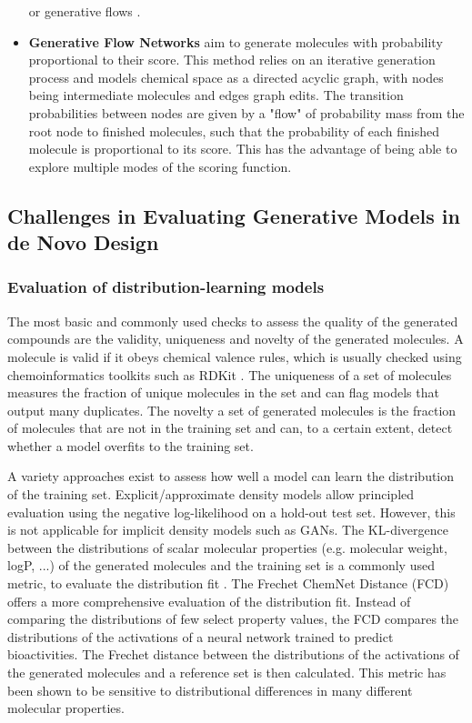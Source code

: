 \begin{itemize}
            or generative flows \citep{madhawaGraphNVPInvertibleFlow2019}.
      \item \textbf{Generative Flow Networks} \citep{bengioFlowNetworkBased2021} aim to generate
            molecules with probability proportional to their score. This method relies on an
            iterative generation process and models chemical space as a directed acyclic graph, with
            nodes being intermediate molecules and edges graph edits. The transition probabilities
            between nodes are given by a "flow" of probability mass from the root node to finished
            molecules, such that the probability of each finished molecule is proportional to its
            score. This has the advantage of being able to explore multiple modes of the scoring
            function.
\end{itemize}

\subsection{Challenges in Evaluating Generative Models in de Novo Design}
\subsubsection{Evaluation of distribution-learning models}
The most basic and commonly used checks to assess the quality of the generated compounds are the
validity, uniqueness and novelty of the generated molecules. A molecule is valid if it obeys
chemical valence rules, which is usually checked using chemoinformatics toolkits such as RDKit
\citep{landrumRDKitOpensourceCheminformatics2006}. The uniqueness of a set of molecules measures the
fraction of unique molecules in the set and can flag models that output many duplicates. The novelty
a set of generated molecules is the fraction of molecules that are not in the training set and can,
to a certain extent, detect whether a model overfits to the training set.

A variety approaches exist to assess how well a model can learn the distribution of the training
set. Explicit/approximate density models allow principled evaluation using the negative
log-likelihood on a hold-out test set. However, this is not applicable for implicit density models
such as GANs. The KL-divergence between the distributions of scalar molecular properties (e.g.
molecular weight, logP, ...) of the generated molecules and the training set is a commonly used
metric, to evaluate the distribution fit \citep{brownGuacaMolBenchmarkingModels2019}. The Frechet
ChemNet Distance (FCD) \citep{preuerFrechetChemNetDistance2018} offers a more comprehensive evaluation
of the distribution fit. Instead of comparing the distributions of few select property values,
the FCD compares the distributions of the activations of a neural network trained to predict
bioactivities. The Frechet distance between the distributions of the activations of the generated
molecules and a reference set is then calculated. This metric has been shown to be sensitive to
distributional differences in many different molecular properties.

